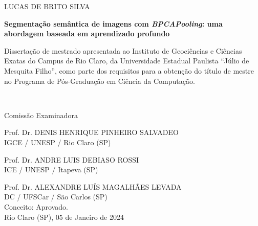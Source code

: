 \newpage
\thispagestyle{empty}

\begin{center}
    {LUCAS DE BRITO SILVA\\}
    
    \vspace{2cm}
    
    \textbf{Segmentação semântica de imagens com \textit{BPCAPooling}: uma abordagem baseada em aprendizado profundo}
    
    \vspace{4cm}
    
    \hspace{.45\linewidth}
    \begin{minipage}{.50\linewidth}
    \small
        Dissertação de mestrado apresentada ao Instituto de Geociências e Ciências Exatas do Campus de Rio Claro, da Universidade Estadual Paulista ``Júlio de Mesquita Filho'', como parte dos requisitos para a obtenção do título de mestre no Programa de Pós-Graduação em Ciência da Computação.
    \end{minipage} \\
    \normalsize
    
    \vspace{1cm}
    
    Comissão Examinadora\\
    
    \vspace{1cm}

    Prof. Dr. DENIS HENRIQUE PINHEIRO SALVADEO\\
    IGCE / UNESP / Rio Claro (SP)\\
    \vspace{0.5cm}


    Prof. Dr. ANDRE LUIS DEBIASO ROSSI\\
    ICE / UNESP / Itapeva (SP)\\
    \vspace{0.5cm}


    Prof. Dr. ALEXANDRE LUÍS MAGALHÃES LEVADA\\
    DC / UFSCar / São Carlos (SP) \\


    Conceito: Aprovado. \\

    
    \vspace{2cm}
    Rio Claro (SP), 05 de Janeiro de 2024
\end{center}